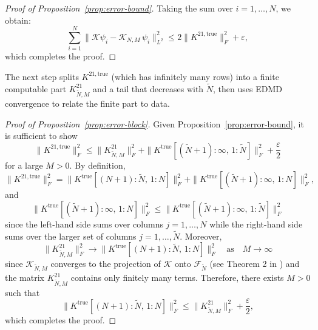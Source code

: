 \documentclass{article}
\theoremstyle{plain}
\theoremstyle{definition}
\newcommand{\norm}[1]{\| #1 \|}
\def\Koop{\mathcal{K}}
\def\Fc{\mathcal{F}}
\begin{document}
\begin{proof}[Proof of Proposition~\ref{prop:error-bound}]
	Taking the sum over $i=1,\ldots,N$, we obtain:
	\begin{equation*}
		\sum_{i=1}^N \norm{\Koop \psi_i - \Koop_{N,M}\,\psi_i}_{L^2}^2
		\leq 2\norm{K^{21,\text{true}}}_{F}^2+ \varepsilon,
	\end{equation*}
	which completes the proof. 
\end{proof}


The next step splits $K^{21,\text{true}}$ (which has infinitely many rows) into a finite computable part $K_{\tilde{N},M}^{21}$ and a tail that decreases with $\tilde{N}$, then uses EDMD convergence to relate the finite part to data.

\begin{proof}[Proof of Proposition~\ref{prop:error-block}]
	Given Proposition~\ref{prop:error-bound}, it is sufficient to show
	\begin{equation*}
		\norm{K^{21,\text{true}}}_{F}^2
		\leq
		\norm{ K_{\tilde{N},M}^{21} }_F^2 + \norm{ K^{\text{true}}[(\tilde{N}+1):\infty,\, 1:\tilde{N}] }_F^2 + \frac{\varepsilon}{2}
	\end{equation*}
	for a large $M>0$. By definition,
	\begin{equation*}
		\norm{K^{21,\text{true}}}_{F}^2 = \norm{ K^{\text{true}}[(N+1):\tilde{N},\, 1:N] }_F^2
		+
		\norm{ K^{\text{true}}[(\tilde{N}+1):\infty,\, 1:N] }_F^2,
	\end{equation*}
	and
	\begin{equation*}
		\norm{ K^{\text{true}}[(\tilde{N}+1):\infty,\, 1:N] }_F^2
		\leq
		\norm{ K^{\text{true}}[(\tilde{N}+1):\infty,\, 1:\tilde{N}] }_F^2
	\end{equation*}
	since the left-hand side sums over columns $j = 1,\ldots,N$ while the right-hand side sums over the larger set of columns $j = 1,\ldots,\tilde{N}$. Moreover,
	\begin{equation*}
		\norm{ K_{\tilde{N},M}^{21} }_F^2 \to \norm{ K^{\text{true}}[(N+1):\tilde{N},\, 1:N] }_F^2 \quad \text{as} \quad M \to \infty
	\end{equation*}
	since $\Koop_{\tilde{N},M}$ converges to the projection of $\Koop$ onto $\Fc_{\tilde{N}}$ (see Theorem 2 in \cite{korda2018convergence}) and the matrix $K_{\tilde{N},M}^{21}$ contains only finitely many terms.
	Therefore, there exists $M > 0$ such that
	\begin{equation*}
		\norm{ K^{\text{true}}[(N+1):\tilde{N},\, 1:N] }_F^2
		\leq
		\norm{ K_{\tilde{N},M}^{21} }_F^2  + \frac{\varepsilon}{2},
	\end{equation*}
	which completes the proof.
\end{proof}
\end{document}
